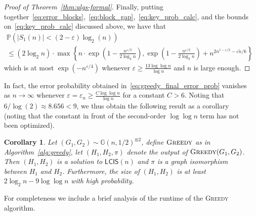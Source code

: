 \documentclass[11pt]{article}
\theoremstyle{plain}
\newtheorem{corollary}{Corollary}
\theoremstyle{definition}
\theoremstyle{remark}
\newcommand{\Gnhalf}{\mathbb{G}(n,1/2)}
\newcommand{\greedy}{\textsc{Greedy} }
\newcommand{\eps}{\varepsilon}
\newcommand{\MCS}{\mathsf{LCIS}}
\renewcommand{\Pr}{\mathbb{P}}
\begin{document}
\begin{proof}[Proof of Theorem~\ref{thm:algs-formal}]
Finally, putting together~\eqref{eq:error_blocks},~\eqref{eq:block_gap},~\eqref{eq:key_prob_calc}, and the bounds on~\eqref{eq:key_prob_calc} discussed above, we have that 
\begin{multline}\label{eq:greedy_final_error_prob}
\Pr \left( |S_{1}(n)| < (2-\eps) \log_{2}(n) \right) \\
\leq (2 \log_2 n) \cdot 
\max \left\{ n \cdot \exp \left( 1 - \frac{n^{\eps/3}}{2 \log_2 n} \right), 
\exp \left( 1 - \frac{n^{\eps/2}}{2 \log_2 n} \right) + n^{2n^{1-\eps/2} - \eps \widetilde{n}/6} \right\}
\end{multline}
which is at most $\exp\left( - n^{\eps/4} \right)$ 
whenever $\eps \geq \frac{13 \log \log n}{\log n}$ 
and $n$ is large enough. 
\end{proof}

In fact, the error probability obtained in~\eqref{eq:greedy_final_error_prob} vanishes as $n \to \infty$ 
whenever 
$\eps = \eps_{n} \geq \frac{C \log \log n}{\log n}$ for a constant $C > 6$. 
Noting that $6 / \log(2)\approx 8.656 < 9$, we thus obtain the following result as a corollary (noting that the constant in front of the second-order $\log \log n$ term has not been optimized). 
\begin{corollary}\label{cor:greedy}
    Let $(G_1, G_2) \sim \Gnhalf^{\otimes 2}$, define $\greedy$  as in Algorithm~\ref{alg:greedy}, 
    let $(H_1, H_2, \pi)$ denote the output of $\greedy(G_1, G_2)$. 
    Then $(H_1, H_2)$ is a solution to $\MCS(n)$ and $\pi$ is a graph isomorphism between $H_{1}$ and $H_{2}$. 
    Furthermore, the size of $(H_1, H_2)$ is at least $2 \log_{2} n - 9 \log \log n$ with high probability.
\end{corollary}

For completeness we include a brief analysis of the runtime of the \greedy algorithm. 
\end{document}
